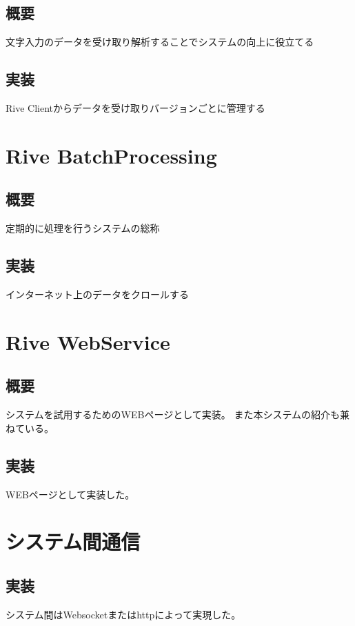 \subsection{概要}
文字入力のデータを受け取り解析することでシステムの向上に役立てる
\subsection{実装}
Rive Clientからデータを受け取りバージョンごとに管理する

\section{Rive BatchProcessing}
\subsection{概要}
定期的に処理を行うシステムの総称
\subsection{実装}
インターネット上のデータをクロールする

\section{Rive WebService}
\subsection{概要}
システムを試用するためのWEBページとして実装。
また本システムの紹介も兼ねている。
\subsection{実装}
WEBページとして実装した。

\section{システム間通信}
\subsection{実装}
システム間はWebsocketまたはhttpによって実現した。
